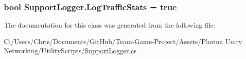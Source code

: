 \subsubsection[{\texorpdfstring{Log\+Traffic\+Stats}{LogTrafficStats}}]{\setlength{\rightskip}{0pt plus 5cm}bool Support\+Logger.\+Log\+Traffic\+Stats = true}\hypertarget{class_support_logger_a73de1756bad6a637924df2975c088e47}{}\label{class_support_logger_a73de1756bad6a637924df2975c088e47}


The documentation for this class was generated from the following file\+:\begin{DoxyCompactItemize}
\item 
C\+:/\+Users/\+Chris/\+Documents/\+Git\+Hub/\+Team-\/\+Game-\/\+Project/\+Assets/\+Photon Unity Networking/\+Utility\+Scripts/\hyperlink{_support_logger_8cs}{Support\+Logger.\+cs}\end{DoxyCompactItemize}
